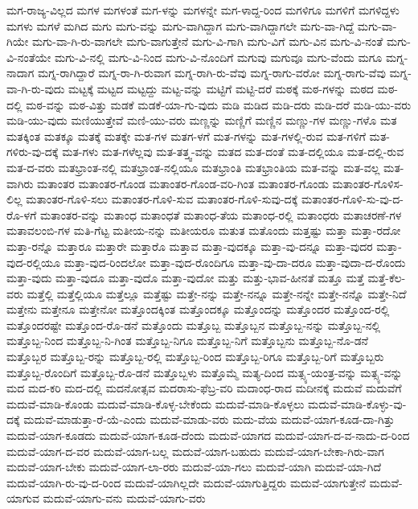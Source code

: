 {ಮಗ-ರಾಜ್ಯ-ವಿಲ್ಲದ
ಮಗಳ
ಮಗಳಂತೆ
ಮಗ-ಳನ್ನು
ಮಗಳನ್ನೇ
ಮಗ-ಳಾದ್ದ-ರಿಂದ
ಮಗಳಿಗೂ
ಮಗಳಿಗೆ
ಮಗಳಿದ್ದಳು
ಮಗಳು
ಮಗಳೆ
ಮಗಿದ
ಮಗು
ಮಗು-ವನ್ನು
ಮಗು-ವಾಗಿದ್ದಾಗ
ಮಗು-ವಾಗಿದ್ದಾಗಲೇ
ಮಗು-ವಾ-ಗಿದ್ದೆ
ಮಗು-ವಾ-ಗಿಯೇ
ಮಗು-ವಾ-ಗಿ-ರು-ವಾಗಲೇ
ಮಗು-ವಾಗುತ್ತೇನೆ
ಮಗು-ವಿ-ಗಾಗಿ
ಮಗು-ವಿಗೆ
ಮಗು-ವಿನ
ಮಗು-ವಿ-ನಂತೆ
ಮಗು-ವಿ-ನಂತೆಯೇ
ಮಗು-ವಿ-ನಲ್ಲಿ
ಮಗು-ವಿ-ನಿಂದ
ಮಗು-ವಿ-ನೊಂದಿಗೆ
ಮಗುವು
ಮಗುವೂ
ಮಗು-ವೆಂದು
ಮಗೂ
ಮಗ್ನ-ನಾದಾಗ
ಮಗ್ನ-ರಾಗಿದ್ದಾರೆ
ಮಗ್ನ-ರಾ-ಗಿ-ರುವಾಗ
ಮಗ್ನ-ರಾಗಿ-ರು-ವೆವು
ಮಗ್ನ-ರಾಗು-ವರೋ
ಮಗ್ನ-ರಾಗು-ವೆವು
ಮಗ್ನ-ವಾ-ಗಿ-ರು-ವುದು
ಮಟ್ಟಕ್ಕೆ
ಮಟ್ಟದ
ಮಟ್ಟದ್ದು
ಮಟ್ಟ-ವನ್ನು
ಮಟ್ಟಿಗೆ
ಮಟ್ಟಿ-ದರೆ
ಮಠಕ್ಕೆ
ಮಠ-ಗಳನ್ನು
ಮಠದ
ಮಠ-ದಲ್ಲಿ
ಮಠ-ವನ್ನು
ಮಠ-ವಿತ್ತು
ಮಡಕೆ
ಮಡಕೆ-ಯಾ-ಗು-ವುದು
ಮಡಿ
ಮಡಿದ
ಮಡಿ-ದರು
ಮಡಿ-ದರೆ
ಮಡಿ-ಯು-ವರು
ಮಡಿ-ಯು-ವುದು
ಮಣಿಯುತ್ತೇವೆ
ಮಣಿ-ಯು-ವರು
ಮಣ್ಣನ್ನು
ಮಣ್ಣಿಗೆ
ಮಣ್ಣಿನ
ಮಣ್ಣು-ಗಳ
ಮಣ್ಣು-ಗಳೊ
ಮತ
ಮತಕ್ಕಿಂತ
ಮತಕ್ಕೂ
ಮತಕ್ಕೆ
ಮತಕ್ಕೇ
ಮತ-ಗಳ
ಮತಗ-ಳಗೆ
ಮತ-ಗಳನ್ನು
ಮತ-ಗಳಲ್ಲಿ-ರುವ
ಮತ-ಗಳಿಗೆ
ಮತ-ಗಳಿರು-ವು-ದಕ್ಕೆ
ಮತ-ಗಳು
ಮತ-ಗಳೆಲ್ಲವು
ಮತ-ತತ್ತ್ವ-ವನ್ನು
ಮತದ
ಮತ-ದಂತೆ
ಮತ-ದಲ್ಲಿಯೂ
ಮತ-ದಲ್ಲಿ-ರುವ
ಮತ-ದ-ವರು
ಮತಭ್ರಾಂತ-ನಲ್ಲಿ
ಮತಭ್ರಾಂತ-ನಲ್ಲಿಯೂ
ಮತಭ್ರಾಂತಿ
ಮತಭ್ರಾಂತಿಯ
ಮತ-ವನ್ನು
ಮತ-ವಲ್ಲ
ಮತ-ವಾಗಿರು
ಮತಾಂತರ
ಮತಾಂತರ-ಗೊಂಡ
ಮತಾಂತರ-ಗೊಂಡ-ವರಿ-ಗಿಂತ
ಮತಾಂತರ-ಗೊಂಡು
ಮತಾಂತರ-ಗೊಳಿಸ-ಲಿಲ್ಲ
ಮತಾಂತರ-ಗೊಳಿ-ಸಲು
ಮತಾಂತರ-ಗೊಳಿ-ಸುವ
ಮತಾಂತರ-ಗೊಳಿ-ಸುವು-ದಕ್ಕೆ
ಮತಾಂತರ-ಗೊಳಿ-ಸು-ವು-ದ-ರೊ-ಳಗೆ
ಮತಾಂತರ-ವನ್ನು
ಮತಾಂಧ
ಮತಾಂಧತೆ
ಮತಾಂಧ-ತೆಯ
ಮತಾಂಧ-ರಲ್ಲಿ
ಮತಾಂಧರು
ಮತಾಚರಣೆ-ಗಳ
ಮತಾವಲಂಬಿ-ಗಳ
ಮತಿ-ಗೆಟ್ಟ
ಮತೀಯ-ನನ್ನು
ಮತೀಯರೂ
ಮತುತ
ಮತೊಂದು
ಮತ್ತಷ್ಟು
ಮತ್ತಾ
ಮತ್ತಾ-ರದೋ
ಮತ್ತಾ-ರನ್ನೊ
ಮತ್ತಾರೂ
ಮತ್ತಾರೇ
ಮತ್ತಾರೊ
ಮತ್ತಾವ
ಮತ್ತಾ-ವುದಕ್ಕೂ
ಮತ್ತಾ-ವು-ದನ್ನೂ
ಮತ್ತಾ-ವುದರ
ಮತ್ತಾ-ವುದ-ರಲ್ಲಿಯೂ
ಮತ್ತಾ-ವುದ-ರಿಂದಲೋ
ಮತ್ತಾ-ವುದ-ರೊಂದಿಗೂ
ಮತ್ತಾ-ವು-ದಾ-ದರೂ
ಮತ್ತಾ-ವುದಾ-ದ-ರೊಂದು
ಮತ್ತಾ-ವುದು
ಮತ್ತಾ-ವುದೂ
ಮತ್ತಾ-ವುದೊ
ಮತ್ತಾ-ವುದೋ
ಮತ್ತು
ಮತ್ತು-ಭಾವ-ಹೀನತೆ
ಮತ್ತೂ
ಮತ್ತೆ
ಮತ್ತೆ-ಕೆಲ-ವರು
ಮತ್ತೆಲ್ಲಿ
ಮತ್ತೆಲ್ಲಿಯೂ
ಮತ್ತೆಲ್ಲೂ
ಮತ್ತೆಷ್ಟು
ಮತ್ತೇ-ನನ್ನು
ಮತ್ತೇ-ನನ್ನೂ
ಮತ್ತೇ-ನನ್ನೇ
ಮತ್ತೇ-ನನ್ನೊ
ಮತ್ತೇ-ನಿದೆ
ಮತ್ತೇನು
ಮತ್ತೇನೂ
ಮತ್ತೇನೋ
ಮತ್ತೊಂದಕ್ಕಿಂತ
ಮತ್ತೊಂದಕ್ಕೂ
ಮತ್ತೊಂದನ್ನು
ಮತ್ತೊಂದರ
ಮತ್ತೊಂದ-ರಲ್ಲಿ
ಮತ್ತೊಂದರಷ್ಟೇ
ಮತ್ತೊಂದ-ರೊ-ಡನೆ
ಮತ್ತೊಂದು
ಮತ್ತೊಬ್ಬ
ಮತ್ತೊಬ್ಬನ
ಮತ್ತೊಬ್ಬ-ನನ್ನು
ಮತ್ತೊಬ್ಬ-ನಲ್ಲಿ
ಮತ್ತೊಬ್ಬ-ನಿಂದ
ಮತ್ತೊಬ್ಬ-ನಿ-ಗಿಂತ
ಮತ್ತೊಬ್ಬ-ನಿಗೂ
ಮತ್ತೊಬ್ಬ-ನಿಗೆ
ಮತ್ತೊಬ್ಬನು
ಮತ್ತೊಬ್ಬ-ನೊ-ಡನೆ
ಮತ್ತೊಬ್ಬರ
ಮತ್ತೊಬ್ಬ-ರನ್ನು
ಮತ್ತೊಬ್ಬ-ರಲ್ಲಿ
ಮತ್ತೊಬ್ಬ-ರಿಂದ
ಮತ್ತೊಬ್ಬ-ರಿಗೂ
ಮತ್ತೊಬ್ಬ-ರಿಗೆ
ಮತ್ತೊಬ್ಬರು
ಮತ್ತೊಬ್ಬ-ರೊಂದಿಗೆ
ಮತ್ತೊಬ್ಬ-ರೊ-ಡನೆ
ಮತ್ತೊಬ್ಬಳು
ಮತ್ತೊಮ್ಮೆ
ಮತ್ಯ-ದಿಂದ
ಮತ್ಸ್ಯ-ಯಂತ್ರ-ವನ್ನು
ಮತ್ಸ್ಯ-ವನ್ನು
ಮದ
ಮದ-ಕರಿ
ಮದ-ದಲ್ಲಿ
ಮದನೋತ್ಸವ
ಮದರಾಸು-ಫೆಬ್ರ-ವರಿ
ಮದಾಂಧ-ರಾದ
ಮದೀನಕ್ಕೆ
ಮದುವೆ
ಮದುವೆಗೆ
ಮದುವೆ-ಮಾಡಿ-ಕೊಂಡು
ಮದುವೆ-ಮಾಡಿ-ಕೊಳ್ಳ-ಬೇಕೆಂದು
ಮದುವೆ-ಮಾಡಿ-ಕೊಳ್ಳಲು
ಮದುವೆ-ಮಾಡಿ-ಕೊಳ್ಳು-ವು-ದಕ್ಕೆ
ಮದುವೆ-ಮಾಡುತ್ತಾ-ರೆ-ಯೆ-ಎಂದು
ಮದುವೆ-ಮಾಡು-ವರು
ಮದು-ವೆಯ
ಮದುವೆ-ಯಾಗ-ಕೂಡ-ದಾ-ಗಿತ್ತು
ಮದುವೆ-ಯಾಗ-ಕೂಡದು
ಮದುವೆ-ಯಾಗ-ಕೂಡ-ದೆಂದು
ಮದುವೆ-ಯಾಗದ
ಮದುವೆ-ಯಾಗ-ದ-ವ-ನಾದು-ದ-ರಿಂದ
ಮದುವೆ-ಯಾಗ-ದ-ವರ
ಮದುವೆ-ಯಾಗ-ಬಲ್ಲ
ಮದುವೆ-ಯಾಗ-ಬಹುದು
ಮದುವೆ-ಯಾಗ-ಬೇಕಾ-ಗಿರು-ವಾಗ
ಮದುವೆ-ಯಾಗ-ಬೇಕು
ಮದುವೆ-ಯಾಗ-ಲಾ-ರರು
ಮದುವೆ-ಯಾ-ಗಲು
ಮದುವೆ-ಯಾಗಿ
ಮದುವೆ-ಯಾ-ಗಿದೆ
ಮದುವೆ-ಯಾಗಿ-ರು-ವು-ದ-ರಿಂದ
ಮದುವೆ-ಯಾಗಿಲ್ಲದೇ
ಮದುವೆ-ಯಾಗುತ್ತಿದ್ದರು
ಮದುವೆ-ಯಾಗುತ್ತೇನೆ
ಮದುವೆ-ಯಾಗುವ
ಮದುವೆ-ಯಾಗು-ವನು
ಮದುವೆ-ಯಾಗು-ವರು
}
